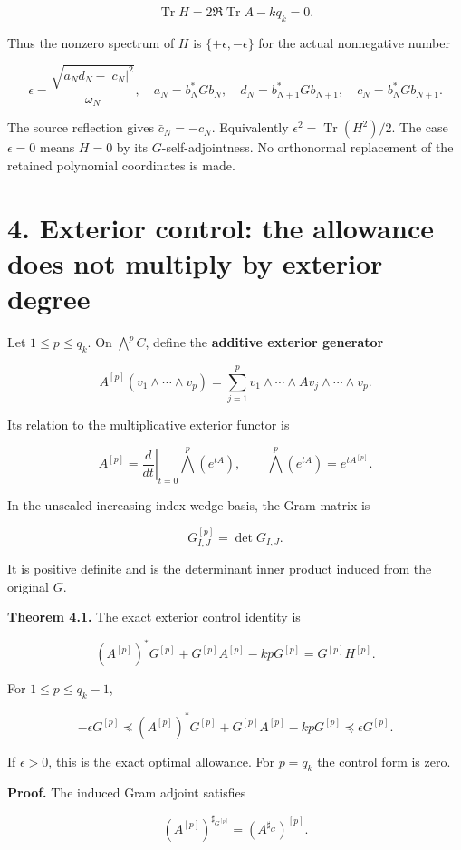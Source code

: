 \documentclass[
  11pt,
]{article}
\begin{document}
\[
\operatorname{Tr}H=2\Re\operatorname{Tr}A-kq_k=0.
\]

Thus the nonzero spectrum of \(H\) is \(\{+\epsilon,-\epsilon\}\) for
the actual nonnegative number

\[
\boxed{
\epsilon=
\frac{\sqrt{a_Nd_N-|c_N|^2}}{\omega_N},\quad
 a_N=b_N^*Gb_N,\quad d_N=b_{N+1}^*Gb_{N+1},\quad
 c_N=b_N^*Gb_{N+1}.
}
\]

The source reflection gives \(\bar c_N=-c_N\). Equivalently
\(\epsilon^2=\operatorname{Tr}(H^2)/2\). The case \(\epsilon=0\) means
\(H=0\) by its \(G\)-self-adjointness. No orthonormal replacement of the
retained polynomial coordinates is made.

\section{4. Exterior control: the allowance does not multiply by
exterior
degree}\label{exterior-control-the-allowance-does-not-multiply-by-exterior-degree}

Let \(1\leq p\leq q_k\). On \(\bigwedge^p C\), define the
\textbf{additive exterior generator}

\[
A^{[p]}(v_1\wedge\cdots\wedge v_p)
=\sum_{j=1}^p
v_1\wedge\cdots\wedge Av_j\wedge\cdots\wedge v_p.
\]

Its relation to the multiplicative exterior functor is

\[
A^{[p]}=\left.\frac{d}{dt}\right|_{t=0}\bigwedge^p(e^{tA}),
\qquad
\bigwedge^p(e^{tA})=e^{tA^{[p]}}.
\]

In the unscaled increasing-index wedge basis, the Gram matrix is

\[
G^{[p]}_{I,J}=\det G_{I,J}.
\]

It is positive definite and is the determinant inner product induced
from the original \(G\).

\textbf{Theorem 4.1.} The exact exterior control identity is

\[
\boxed{
(A^{[p]})^*G^{[p]}+G^{[p]}A^{[p]}-kpG^{[p]}
=G^{[p]}H^{[p]}.
}
\]

For \(1\leq p\leq q_k-1\),

\[
\boxed{
-\epsilon G^{[p]}
\preceq
(A^{[p]})^*G^{[p]}+G^{[p]}A^{[p]}-kpG^{[p]}
\preceq\epsilon G^{[p]}.
}
\]

If \(\epsilon>0\), this is the exact optimal allowance. For \(p=q_k\)
the control form is zero.

\textbf{Proof.} The induced Gram adjoint satisfies

\[
(A^{[p]})^{\sharp_{G^{[p]}}}=(A^{\sharp_G})^{[p]}.
\]
\end{document}
